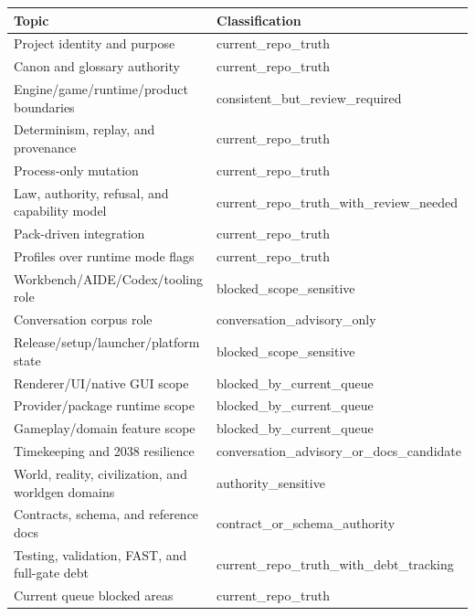 \documentclass[10.5pt,a4paper]{book}
\newcommand{\toprule}{\hline}
\newcommand{\midrule}{\hline}
\newcommand{\bottomrule}{\hline}
\begin{document}
\begin{center}
{\small\renewcommand{\arraystretch}{1.18}
\begin{tabularx}{\linewidth}{@{}>{\raggedright\arraybackslash}X >{\raggedright\arraybackslash}X@{}}
\toprule
\textbf{Topic} & \textbf{Classification} \\
\midrule
Project identity and purpose & current\_\allowbreak{}repo\_\allowbreak{}truth \\
Canon and glossary authority & current\_\allowbreak{}repo\_\allowbreak{}truth \\
Engine/\allowbreak{}game/\allowbreak{}runtime/\allowbreak{}product boundaries & consistent\_\allowbreak{}but\_\allowbreak{}review\_\allowbreak{}required \\
Determinism, replay, and provenance & current\_\allowbreak{}repo\_\allowbreak{}truth \\
Process-\allowbreak{}only mutation & current\_\allowbreak{}repo\_\allowbreak{}truth \\
Law, authority, refusal, and capability model & current\_\allowbreak{}repo\_\allowbreak{}truth\_\allowbreak{}with\_\allowbreak{}review\_\allowbreak{}needed \\
Pack-\allowbreak{}driven integration & current\_\allowbreak{}repo\_\allowbreak{}truth \\
Profiles over runtime mode flags & current\_\allowbreak{}repo\_\allowbreak{}truth \\
Workbench/\allowbreak{}AIDE/\allowbreak{}Codex/\allowbreak{}tooling role & blocked\_\allowbreak{}scope\_\allowbreak{}sensitive \\
Conversation corpus role & conversation\_\allowbreak{}advisory\_\allowbreak{}only \\
Release/\allowbreak{}setup/\allowbreak{}launcher/\allowbreak{}platform state & blocked\_\allowbreak{}scope\_\allowbreak{}sensitive \\
Renderer/\allowbreak{}UI/\allowbreak{}native GUI scope & blocked\_\allowbreak{}by\_\allowbreak{}current\_\allowbreak{}queue \\
Provider/\allowbreak{}package runtime scope & blocked\_\allowbreak{}by\_\allowbreak{}current\_\allowbreak{}queue \\
Gameplay/\allowbreak{}domain feature scope & blocked\_\allowbreak{}by\_\allowbreak{}current\_\allowbreak{}queue \\
Timekeeping and 2038 resilience & conversation\_\allowbreak{}advisory\_\allowbreak{}or\_\allowbreak{}docs\_\allowbreak{}candidate \\
World, reality, civilization, and worldgen domains & authority\_\allowbreak{}sensitive \\
Contracts, schema, and reference docs & contract\_\allowbreak{}or\_\allowbreak{}schema\_\allowbreak{}authority \\
Testing, validation, FAST, and full-\allowbreak{}gate debt & current\_\allowbreak{}repo\_\allowbreak{}truth\_\allowbreak{}with\_\allowbreak{}debt\_\allowbreak{}tracking \\
Current queue blocked areas & current\_\allowbreak{}repo\_\allowbreak{}truth \\
\bottomrule
\end{tabularx}
}
\end{center}
\end{document}
